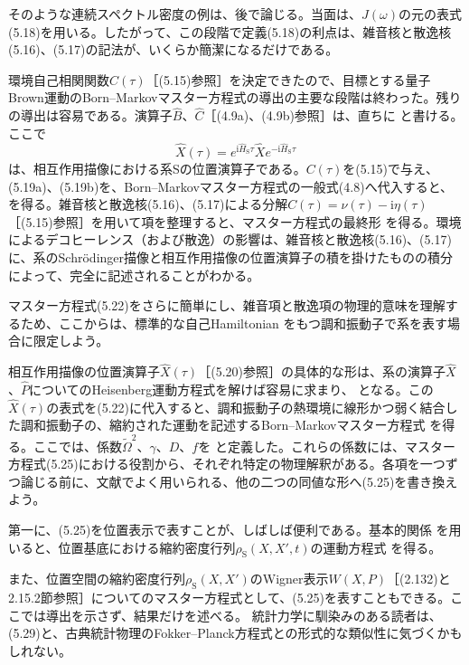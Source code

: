\hypertarget{srcpage:182}{}\label{srcpage:182}
そのような連続スペクトル密度の例は、後で論じる。当面は、$J(\omega)$の元の表式(5.18)を用いる。したがって、この段階で定義(5.18)の利点は、雑音核と散逸核(5.16)、(5.17)の記法が、いくらか簡潔になるだけである。

環境自己相関関数$C(\tau)$［(5.15)参照］を決定できたので、目標とする量子Brown運動のBorn--Markovマスター方程式の導出の主要な段階は終わった。残りの導出は容易である。演算子$\hat B$、$\hat C$［(4.9a)、(4.9b)参照］は、直ちに
と書ける。ここで
\begin{equation}\hat X(\tau)=e^{\mathrm i\hat H_{\mathrm S}\tau}\hat Xe^{-\mathrm i\hat H_{\mathrm S}\tau}\tag{5.20}\end{equation}
は、相互作用描像における系Sの位置演算子である。$C(\tau)$を(5.15)で与え、(5.19a)、(5.19b)を、Born--Markovマスター方程式の一般式(4.8)へ代入すると、
を得る。雑音核と散逸核(5.16)、(5.17)による分解$C(\tau)=\nu(\tau)-\mathrm i\eta(\tau)$［(5.15)参照］を用いて項を整理すると、マスター方程式の最終形
を得る。環境によるデコヒーレンス（および散逸）の影響は、雑音核と散逸核(5.16)、(5.17)に、系のSchrödinger描像と相互作用描像の位置演算子の積を掛けたものの積分によって、完全に記述されることがわかる。

マスター方程式(5.22)をさらに簡単にし、雑音項と散逸項の物理的意味を理解するため、ここからは、標準的な自己Hamiltonian
をもつ調和振動子で系を表す場合に限定しよう。

\hypertarget{srcpage:183}{}\label{srcpage:183}
相互作用描像の位置演算子$\hat X(\tau)$［(5.20)参照］の具体的な形は、系の演算子$\hat X$、$\hat P$についてのHeisenberg運動方程式を解けば容易に求まり、
となる。この$\hat X(\tau)$の表式を(5.22)に代入すると、調和振動子の熱環境に線形かつ弱く結合した調和振動子の、縮約された運動を記述するBorn--Markovマスター方程式
を得る。ここでは、係数$\widetilde\Omega^2$、$\gamma$、$D$、$f$を
と定義した。これらの係数には、マスター方程式(5.25)における役割から、それぞれ特定の物理解釈がある。各項を一つずつ論じる前に、文献でよく用いられる、他の二つの同値な形へ(5.25)を書き換えよう。

第一に、(5.25)を位置表示で表すことが、しばしば便利である。基本的関係
を用いると、位置基底における縮約密度行列$\rho_{\mathrm S}(X,X',t)$の運動方程式
を得る。

\hypertarget{srcpage:184}{}\label{srcpage:184}
また、位置空間の縮約密度行列$\rho_{\mathrm S}(X,X')$のWigner表示$W(X,P)$［(2.132)と2.15.2節参照］についてのマスター方程式として、(5.25)を表すこともできる。ここでは導出を示さず、結果だけを述べる\cite{ref219}。
統計力学に馴染みのある読者は、(5.29)と、古典統計物理のFokker--Planck方程式との形式的な類似性に気づくかもしれない。

